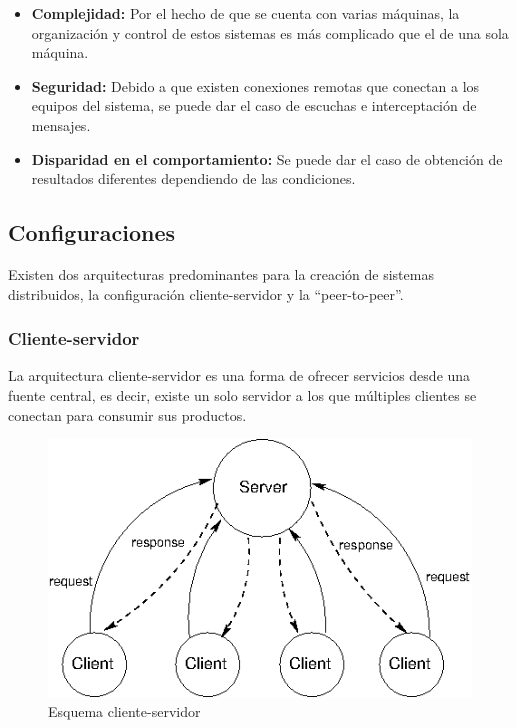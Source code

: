 \begin{itemize}
	\item \textbf{Complejidad:} Por el hecho de que se cuenta con varias máquinas, la organización y control de estos sistemas es más complicado que el de una sola máquina.
	
	\item \textbf{Seguridad:} Debido a que existen conexiones remotas que conectan a los equipos del sistema, se puede dar el caso de escuchas e interceptación de mensajes.
	
	\item \textbf{Disparidad en el comportamiento:} Se puede dar el caso de obtención de resultados diferentes dependiendo de las condiciones.
\end{itemize}

\subsection{Configuraciones}
Existen dos arquitecturas predominantes para la creación de sistemas distribuidos, la configuración cliente-servidor y la ``peer-to-peer''.

\subsubsection{Cliente-servidor}
La arquitectura cliente-servidor es una forma de ofrecer servicios desde una fuente central, es decir, existe un solo servidor a los que múltiples clientes se conectan para consumir sus productos. 

\begin{figure}[htp!]
	\centering
	\caption{Esquema cliente-servidor  \cite{computacionDistribuidad}}
	\label{clientserver}
	\vspace{5pt}
	\includegraphics[scale=0.6]{graphics/clientserver}
\end{figure}

